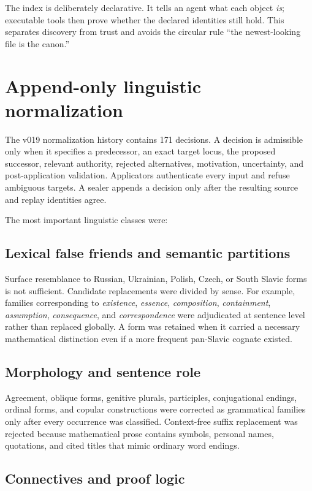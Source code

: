 \documentclass[11pt]{article}
\begin{document}
The index is deliberately declarative. It tells an agent what each object \emph{is}; executable tools then prove whether the declared identities still hold. This separates discovery from trust and avoids the circular rule ``the newest-looking file is the canon.''

\section{Append-only linguistic normalization}

The v019 normalization history contains 171 decisions. A decision is admissible only when it specifies a predecessor, an exact target locus, the proposed successor, relevant authority, rejected alternatives, motivation, uncertainty, and post-application validation. Applicators authenticate every input and refuse ambiguous targets. A sealer appends a decision only after the resulting source and replay identities agree.

The most important linguistic classes were:

\subsection{Lexical false friends and semantic partitions}

Surface resemblance to Russian, Ukrainian, Polish, Czech, or South Slavic forms is not sufficient. Candidate replacements were divided by sense. For example, families corresponding to \emph{existence}, \emph{essence}, \emph{composition}, \emph{containment}, \emph{assumption}, \emph{consequence}, and \emph{correspondence} were adjudicated at sentence level rather than replaced globally. A form was retained when it carried a necessary mathematical distinction even if a more frequent pan-Slavic cognate existed.

\subsection{Morphology and sentence role}

Agreement, oblique forms, genitive plurals, participles, conjugational endings, ordinal forms, and copular constructions were corrected as grammatical families only after every occurrence was classified. Context-free suffix replacement was rejected because mathematical prose contains symbols, personal names, quotations, and cited titles that mimic ordinary word endings.

\subsection{Connectives and proof logic}
\end{document}
